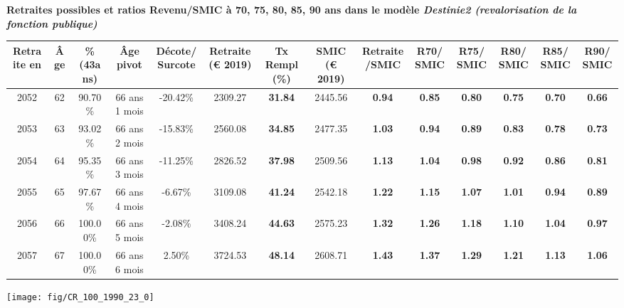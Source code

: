  \vspace{0.1cm} 
{\bf \noindent Retraites possibles et ratios Revenu/SMIC à 70, 75, 80, 85, 90 ans dans le modèle \emph{Destinie2 (revalorisation de la fonction publique)}}  
 
\begin{adjustbox}{max width=\textwidth} 
\begin{tabular}[htb]{|c|c||c|c|c||c|c||c|c||c|c|c|c|c|} 
\hline 
 Retraite en &  Âge &  \%(43ans) &  Âge pivot &  Décote/Surcote &  Retraite (\euro{} 2019) &  Tx Rempl(\%) &  SMIC (\euro{} 2019) &  Retraite/SMIC &  R70/SMIC &  R75/SMIC &  R80/SMIC &  R85/SMIC &  R90/SMIC \\ 
\hline \hline 
 2052 &  62 &  90.70\% &  66 ans 1 mois &  -20.42\% &  2309.27 &  {\bf 31.84} &  2445.56 &  {\bf {\color{red} 0.94}} &  {\bf {\color{red} 0.85}} &  {\bf {\color{red} 0.80}} &  {\bf {\color{red} 0.75}} &  {\bf {\color{red} 0.70}} &  {\bf {\color{red} 0.66}} \\ 
\hline 
 2053 &  63 &  93.02\% &  66 ans 2 mois &  -15.83\% &  2560.08 &  {\bf 34.85} &  2477.35 &  {\bf 1.03} &  {\bf {\color{red} 0.94}} &  {\bf {\color{red} 0.89}} &  {\bf {\color{red} 0.83}} &  {\bf {\color{red} 0.78}} &  {\bf {\color{red} 0.73}} \\ 
\hline 
 2054 &  64 &  95.35\% &  66 ans 3 mois &  -11.25\% &  2826.52 &  {\bf 37.98} &  2509.56 &  {\bf 1.13} &  {\bf 1.04} &  {\bf {\color{red} 0.98}} &  {\bf {\color{red} 0.92}} &  {\bf {\color{red} 0.86}} &  {\bf {\color{red} 0.81}} \\ 
\hline 
 2055 &  65 &  97.67\% &  66 ans 4 mois &  -6.67\% &  3109.08 &  {\bf 41.24} &  2542.18 &  {\bf 1.22} &  {\bf 1.15} &  {\bf 1.07} &  {\bf 1.01} &  {\bf {\color{red} 0.94}} &  {\bf {\color{red} 0.89}} \\ 
\hline 
 2056 &  66 &  100.00\% &  66 ans 5 mois &  -2.08\% &  3408.24 &  {\bf 44.63} &  2575.23 &  {\bf 1.32} &  {\bf 1.26} &  {\bf 1.18} &  {\bf 1.10} &  {\bf 1.04} &  {\bf {\color{red} 0.97}} \\ 
\hline 
 2057 &  67 &  100.00\% &  66 ans 6 mois &  2.50\% &  3724.53 &  {\bf 48.14} &  2608.71 &  {\bf 1.43} &  {\bf 1.37} &  {\bf 1.29} &  {\bf 1.21} &  {\bf 1.13} &  {\bf 1.06} \\ 
\hline 
\hline 
\end{tabular} 
\end{adjustbox} 
 
 \vspace{0.1cm} 

 {\hspace{-2.2cm}\texttt{[image: fig/CR\_100\_1990\_23\_0]}} 

